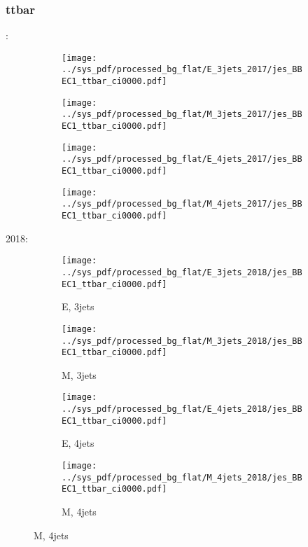 \documentclass{beamer}
\begin{document}
\begin{frame}
\frametitle{ttbar}
\fontsize{5}{1}:
\begin{figure}
\centering
\begin{subfigure}[b]{0.24\textwidth}
\texttt{[image: ../sys\_pdf/processed\_bg\_flat/E\_3jets\_2017/jes\_BBEC1\_ttbar\_ci0000.pdf]}
\end{subfigure}
\begin{subfigure}[b]{0.24\textwidth}
\texttt{[image: ../sys\_pdf/processed\_bg\_flat/M\_3jets\_2017/jes\_BBEC1\_ttbar\_ci0000.pdf]}
\end{subfigure}
\begin{subfigure}[b]{0.24\textwidth}
\texttt{[image: ../sys\_pdf/processed\_bg\_flat/E\_4jets\_2017/jes\_BBEC1\_ttbar\_ci0000.pdf]}
\end{subfigure}
\begin{subfigure}[b]{0.24\textwidth}
\texttt{[image: ../sys\_pdf/processed\_bg\_flat/M\_4jets\_2017/jes\_BBEC1\_ttbar\_ci0000.pdf]}
\end{subfigure}
\end{figure}
2018:
\begin{figure}
\centering
\begin{subfigure}[b]{0.24\textwidth}
\texttt{[image: ../sys\_pdf/processed\_bg\_flat/E\_3jets\_2018/jes\_BBEC1\_ttbar\_ci0000.pdf]}
\captionsetup{font=tiny}
\caption{E, 3jets}
\end{subfigure}
\begin{subfigure}[b]{0.24\textwidth}
\texttt{[image: ../sys\_pdf/processed\_bg\_flat/M\_3jets\_2018/jes\_BBEC1\_ttbar\_ci0000.pdf]}
\captionsetup{font=tiny}
\caption{M, 3jets}
\end{subfigure}
\begin{subfigure}[b]{0.24\textwidth}
\texttt{[image: ../sys\_pdf/processed\_bg\_flat/E\_4jets\_2018/jes\_BBEC1\_ttbar\_ci0000.pdf]}
\captionsetup{font=tiny}
\caption{E, 4jets}
\end{subfigure}
\begin{subfigure}[b]{0.24\textwidth}
\texttt{[image: ../sys\_pdf/processed\_bg\_flat/M\_4jets\_2018/jes\_BBEC1\_ttbar\_ci0000.pdf]}
\captionsetup{font=tiny}
\caption{M, 4jets}
\end{subfigure}
\end{figure}
\end{frame}
\end{document}
